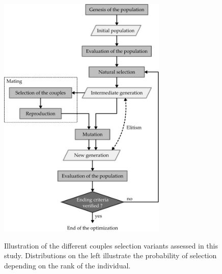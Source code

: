 \documentclass{ametsoc}
\begin{document}
\begin{figure}[t]
	\begin{center}
		\noindent\includegraphics[width=19pc,angle=0]{fig02.pdf}\\
	\end{center}
	\caption{Illustration of the different couples selection variants assessed in this study. Distributions on the left illustrate the probability of selection depending on the rank of the individual.}
	\label{fig:illustration_couples}
\end{figure}
\end{document}
